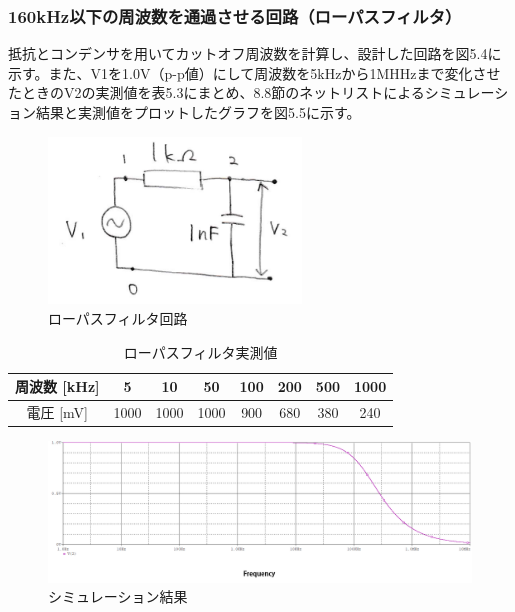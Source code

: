 \documentclass{jlreq}
\numberwithin{equation}{section}
\begin{document}
\subsubsection{160kHz以下の周波数を通過させる回路（ローパスフィルタ）}
抵抗とコンデンサを用いてカットオフ周波数を計算し、設計した回路を図5.4に示す。また、V1を1.0V（p-p値）にして周波数を5kHzから1MHHzまで変化させたときのV2の実測値を表5.3にまとめ、8.8節のネットリストによるシミュレーション結果と実測値をプロットしたグラフを図5.5に示す。

\begin{figure}[H]
  \centering
  \includegraphics[width=0.6\textwidth]{assets/lowpasskairo.png}
  \caption{ローパスフィルタ回路}
\end{figure}

\begin{table}[H]
  \centering
  \caption{ローパスフィルタ実測値}
  \begin{tabular}{|c|c|c|c|c|c|c|c|}
    \hline
    周波数 [kHz] & 5 & 10 & 50 & 100 & 200 & 500 & 1000 \\ \hline
    電圧 [mV] & 1000 & 1000 & 1000 & 900 & 680 & 380 & 240 \\ \hline
  \end{tabular}
\end{table}

\begin{figure}[H]
  \centering
  \includegraphics[width=\textwidth]{assets/lowpass.png}
  \caption{シミュレーション結果}
\end{figure}
\end{document}
